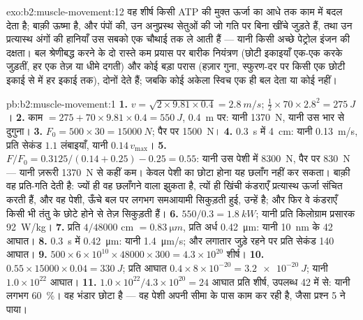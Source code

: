 \begin{solution}{exo:b2:muscle-movement:12}
वह शीर्ष किसी ATP की मुक्त ऊर्जा का आधे तक काम में बदल देता है;
बाक़ी ऊष्मा है, और पंपों की, उन अनुप्रस्थ सेतुओं की जो गति पर बिना खींचे जुड़ते
हैं, तथा उन प्रत्यास्थ अंगों की हानियाँ उस सबको
एक चौथाई तक ले आती हैं --- यानी किसी अच्छे पेट्रोल
इंजन की दक्षता। बल श्रेणीबद्ध करने के दो रास्ते कम प्रयास पर बारीक नियंत्रण
(छोटी इकाइयाँ एक-एक करके जुड़तीं, हर एक तेज़ या
धीमे दगती) और कोई बड़ा परास (हज़ार गुना, स्फुरण-दर पर किसी एक छोटी इकाई से
 में हर इकाई तक), दोनों देते हैं; जबकि कोई अकेला स्विच
एक ही बल देता या कोई नहीं।
\end{solution}

\begin{solution}{pb:b2:muscle-movement:1}
\textbf{1.} $v = \sqrt{2\times 9.81\times 0.4} = \qty{2.8}{m/s}$;
$\tfrac12\times 70\times 2.8^{2} = \qty{275}{J}$।
\textbf{2.} काम $= 275 + 70\times 9.81\times 0.4 = \qty{550}{J}$,
\qty{0.4}{m} पर: यानी \qty{1370}{N}, यानी उस भार से दुगुना।
\textbf{3.} $F_0 = 500\times 30 = \qty{15000}{N}$; पैर पर
\qty{1500}{N}।
\textbf{4.} \qty{0.3}{s} में \qty{4}{cm}: यानी \qty{0.13}{m/s}, प्रति सेकंड $1.1$
लंबाइयाँ, यानी $0.14\,v_{\max}$।
\textbf{5.} $F/F_0 = 0.3125/(0.14 + 0.25) - 0.25 = 0.55$: यानी उस पेशी में \qty{8300}{N},
पैर पर \qty{830}{N} --- यानी ज़रूरी \qty{1370}{N} से कहीं
कम। केवल पेशी का छोटा होना यह छलाँग नहीं कर सकता।
बाक़ी वह प्रति-गति देती है: ज्यों ही वह छलाँगने वाला झुकता है, त्यों ही
खिंची कंडराएँ प्रत्यास्थ ऊर्जा संचित करती हैं, और वह पेशी, ऊँचे बल पर
लगभग समआयामी सिकुड़ती हुई, उन्हें  है; और फिर वे कंडराएँ
किसी भी तंतु के छोटे होने से तेज़ सिकुड़ती हैं।
\textbf{6.} $550/0.3 = \qty{1.8}{kW}$; यानी प्रति किलोग्राम प्रसारक \qty{92}{W/kg}।
\textbf{7.} प्रति  $4/\num{48000}$ cm $= \qty{0.83}{\micro m}$,
प्रति अर्ध \qty{0.42}{\micro m}: यानी \qty{10}{nm} के 42 आघात।
\textbf{8.} \qty{0.3}{s} में \qty{0.42}{\micro m}: यानी \qty{1.4}{\micro m/s};
और लगातार जुड़े रहने पर प्रति सेकंड 140 आघात।
\textbf{9.} $500\times 6\times 10^{10}\times \num{48000}\times 300 =
4.3\times 10^{20}$ शीर्ष।
\textbf{10.} $0.55\times \num{15000}\times 0.04 = \qty{330}{J}$; प्रति
आघात $0.4\times 8\times 10^{-20} = \qty{3.2e-20}{J}$; यानी $1.0\times
10^{22}$ आघात।
\textbf{11.} $1.0\times 10^{22}/4.3\times 10^{20} = 24$ आघात प्रति
शीर्ष, उपलब्ध 42 में से: यानी लगभग \qty{60}{\%}। वह भंडार
छोटा है --- वह पेशी अपनी सीमा के पास काम कर रही है, जैसा प्रश्न 5 ने
पाया।

\end{solution}
